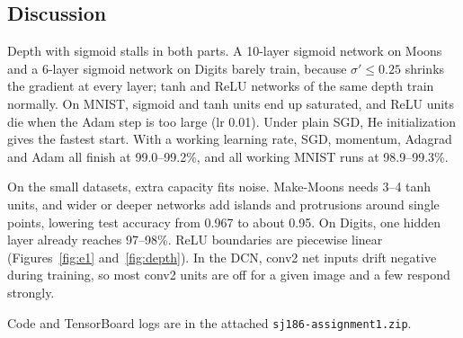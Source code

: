 \documentclass[11pt]{article}
\begin{document}
\subsection{Discussion}

Depth with sigmoid stalls in both parts. A 10-layer sigmoid network on Moons and a 6-layer sigmoid network on Digits barely train, because $\sigma'\le 0.25$ shrinks the gradient at every layer; tanh and ReLU networks of the same depth train normally. On MNIST, sigmoid and tanh units end up saturated, and ReLU units die when the Adam step is too large (lr 0.01). Under plain SGD, He initialization gives the fastest start. With a working learning rate, SGD, momentum, Adagrad and Adam all finish at 99.0--99.2\%, and all working MNIST runs at 98.9--99.3\%.

On the small datasets, extra capacity fits noise. Make-Moons needs 3--4 tanh units, and wider or deeper networks add islands and protrusions around single points, lowering test accuracy from 0.967 to about 0.95. On Digits, one hidden layer already reaches 97--98\%. ReLU boundaries are piecewise linear (Figures~\ref{fig:e1} and~\ref{fig:depth}). In the DCN, conv2 net inputs drift negative during training, so most conv2 units are off for a given image and a few respond strongly.

\medskip
\noindent Code and TensorBoard logs are in the attached \texttt{sj186-assignment1.zip}.
\end{document}
